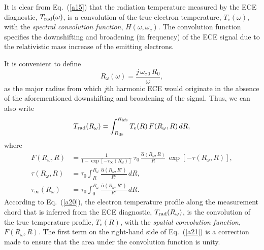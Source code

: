 \documentclass[12pt,prb,aps]{revtex4-1}
\begin{document}
 It is clear from Eq.~(\ref{a15}) that the radiation temperature measured by the ECE diagnostic, $T_{\rm rad}(\omega)$,  is a convolution of the true
electron temperature, $T_e(\omega)$,  with the {\em spectral convolution function}, $H(\omega,\omega_c)$. The convolution function specifies the downshifting and broadening   (in frequency) of the ECE
signal due to the relativistic mass increase of the emitting electrons.

It is convenient to define
\begin{equation}
R_\omega(\omega) = \frac{j\,\omega_{c\,0}\,R_0}{\omega},
\end{equation}
as the major radius from which $j$th harmonic ECE would originate in the absence of the aforementioned downshifting and broadening of the signal. 
Thus, we can also write
\begin{equation}\label{a20}
T_{\rm rad}(R_\omega) = \int_{R_{\rm lfs}}^{R_{\rm hfs}}T_e(R)\,F(R_\omega,R)\,dR,
\end{equation}
where
\begin{align}\label{a21}
F(R_\omega,R) &= \frac{1}{1-\exp[-\tau_\infty(R_\omega)]}\,\tau_0\,\frac{\hat{\alpha}(R_\omega,R)}{R}\,\exp[-\tau(R_\omega, R)],\\[0.5ex]
\tau(R_\omega,R) &= \tau_0\int_R^{R_\omega}\frac{\hat{\alpha}(R_\omega,R')}{R'}\,dR,\\[0.5ex]
\tau_\infty(R_\omega) &= \tau_0\int_0^{R_\omega}\frac{\hat{\alpha}(R_\omega,R')}{R'}\,dR.
\end{align}
According to Eq.~(\ref{a20}), the electron temperature profile along the measurement chord that is inferred from the ECE diagnostic, $T_{\rm rad}(R_\omega)$,
is the convolution of the true temperature profile, $T_e(R)$, with the {\em spatial convolution function}, $F(R_\omega,R)$. The first term on the right-hand side of
Eq.~(\ref{a21}) is a correction made to ensure that the area under the convolution function is unity. 
\end{document}
